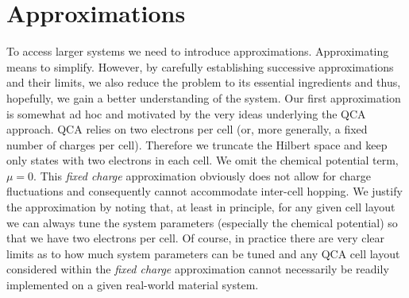 \chapter{Approximations}
\graphicspath{{../gfx/chapter02/}{../plots/chapter02/}}


To access larger systems we need to introduce approximations. Approximating
means to simplify. However, by carefully establishing successive approximations
and their limits, we also reduce the problem to its essential ingredients and
thus, hopefully, we gain a better understanding of the system. Our first
approximation is somewhat ad hoc and motivated by the very ideas underlying the
QCA approach. QCA relies on two electrons per cell (or, more generally, a fixed
number of charges per cell). Therefore we truncate the Hilbert space and keep
only states with two electrons in each cell. We omit the chemical potential
term, $\mu = 0$. This \emph{fixed charge} approximation obviously does not allow
for charge fluctuations and consequently cannot accommodate inter-cell hopping.
We justify the approximation by noting that, at least in principle, for any
given cell layout we can always tune the system parameters (especially the chemical
potential) so that we have two electrons per cell. Of course, in practice there
are very clear limits as to how much system parameters can be tuned and any QCA
cell layout considered within the \emph{fixed charge} approximation cannot
necessarily be readily implemented on a given real-world material system.

